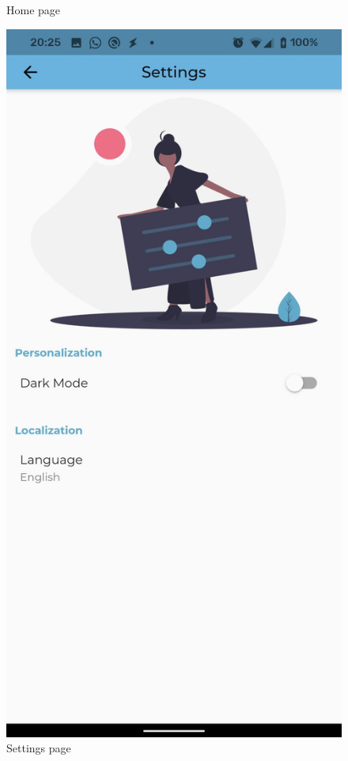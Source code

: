 \begin{figure}[!ht]
\begin{minipage}[b]{0.32\textwidth}
        \caption{Home page}
        \label{4:fig:home}
    \end{minipage}
    \hfill
    \begin{minipage}[b]{0.32\textwidth}
        \captionsetup{justification=centering}
        \includegraphics[width=\textwidth]{figures/app/flutter/settings.jpg}
        \caption{Settings page}
        \label{4:fig:settings}
    \end{minipage}
\end{figure}

